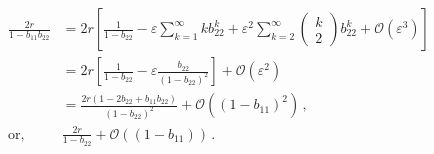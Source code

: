 \begin{align*}
\frac{2r}{1-b_{11}b_{22}} & = 2r\left[\frac{1}{1-b_{22}} -
\varepsilon\sum_{k=1}^\infty kb_{22}^k + \varepsilon^2\sum_{k=2}^\infty\left(\begin{array}{c}k\\2\end{array}\right)b_{22}^k + \mathcal{O}(\varepsilon^3)
\right]\\
& = 2r\left[\frac{1}{1-b_{22}} -
\varepsilon\frac{b_{22}}{(1-b_{22})^2}
\right]
+ \mathcal{O}(\varepsilon^2)\\
& = \frac{2r(1 - 2b_{22} + b_{11}b_{22})}{(1-b_{22})^2}
+ \mathcal{O}((1-b_{11})^2)\,,\\
\text{or,  }~ & \frac{2r}{1-b_{22}}+ \mathcal{O}((1-b_{11}))\,.
\end{align*}


